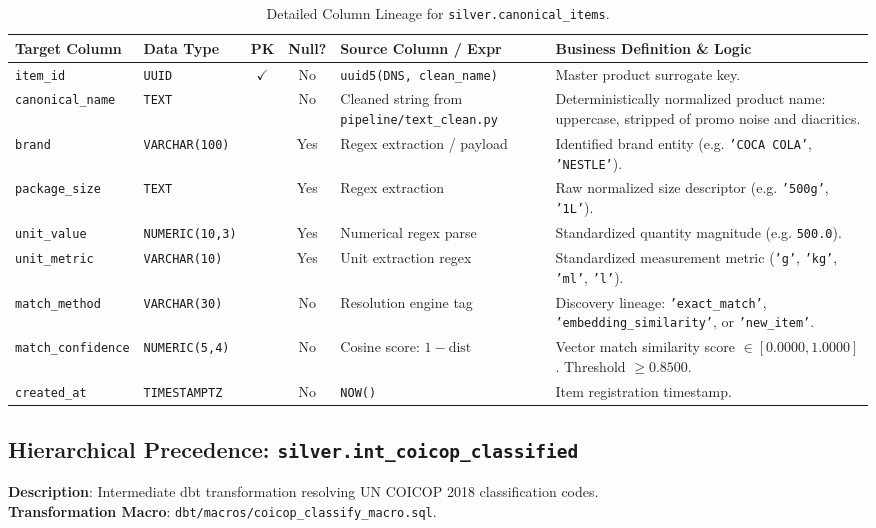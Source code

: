 \documentclass[a4paper, 11pt]{article}
\begin{document}
\begin{table}[H]
\centering
\small
\begin{tabularx}{\textwidth}{l p{2.5cm} c c p{4.2cm} X}
\toprule
\textbf{Target Column} & \textbf{Data Type} & \textbf{PK} & \textbf{Null?} & \textbf{Source Column / Expr} & \textbf{Business Definition \& Logic} \\
\midrule
\texttt{item\_id} & \texttt{UUID} & $\checkmark$ & No & \texttt{uuid5(DNS, clean\_name)} & Master product surrogate key. \\
\texttt{canonical\_name} & \texttt{TEXT} & & No & Cleaned string from \texttt{pipeline/text\_clean.py} & Deterministically normalized product name: uppercase, stripped of promo noise and diacritics. \\
\texttt{brand} & \texttt{VARCHAR(100)} & & Yes & Regex extraction / payload & Identified brand entity (e.g. \texttt{'COCA COLA'}, \texttt{'NESTLE'}). \\
\texttt{package\_size} & \texttt{TEXT} & & Yes & Regex extraction & Raw normalized size descriptor (e.g. \texttt{'500g'}, \texttt{'1L'}). \\
\texttt{unit\_value} & \texttt{NUMERIC(10,3)} & & Yes & Numerical regex parse & Standardized quantity magnitude (e.g. \texttt{500.0}). \\
\texttt{unit\_metric} & \texttt{VARCHAR(10)} & & Yes & Unit extraction regex & Standardized measurement metric (\texttt{'g'}, \texttt{'kg'}, \texttt{'ml'}, \texttt{'l'}). \\
\texttt{match\_method} & \texttt{VARCHAR(30)} & & No & Resolution engine tag & Discovery lineage: \texttt{'exact\_match'}, \texttt{'embedding\_similarity'}, or \texttt{'new\_item'}. \\
\texttt{match\_confidence} & \texttt{NUMERIC(5,4)} & & No & Cosine score: $1 - \text{dist}$ & Vector match similarity score $\in [0.0000, 1.0000]$. Threshold $\ge 0.8500$. \\
\texttt{created\_at} & \texttt{TIMESTAMPTZ} & & No & \texttt{NOW()} & Item registration timestamp. \\
\bottomrule
\end{tabularx}
\caption{Detailed Column Lineage for \texttt{silver.canonical\_items}.}
\end{table}

\subsection{Hierarchical Precedence: \texttt{silver.int\_coicop\_classified}}
\textbf{Description}: Intermediate dbt transformation resolving UN COICOP 2018 classification codes. \\
\textbf{Transformation Macro}: \texttt{dbt/macros/coicop\_classify\_macro.sql}.
\end{document}
